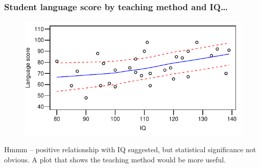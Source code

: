 \documentclass{beamer}\usepackage[]{graphicx}\usepackage[]{xcolor}
\begin{document}
\begin{frame}[fragile]
\frametitle{Student language score by teaching method and IQ\ldots}


\begin{figure}
  \centering
  \includegraphics{figure/RC-H09-002}
\end{figure}

Hmmm -- positive relationship with IQ suggested, but statistical significance not obvious. A plot that shows the teaching method would be more useful.
\end{frame}
\end{document}
